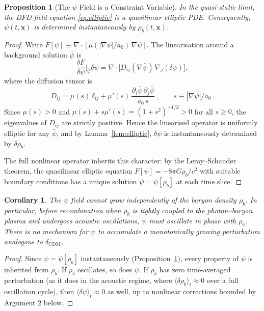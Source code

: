\documentclass[12pt,a4paper]{article}
\newtheorem{proposition}[theorem]{Proposition}
\newtheorem{corollary}[theorem]{Corollary}
\begin{document}
\begin{proposition}[The $\psi$ Field is a Constraint Variable]
\label{prop:psi-constraint}
In the quasi-static limit, the DFD field equation \eqref{eq:elliptic}
is a quasilinear elliptic PDE. Consequently, $\psi(t,\mathbf{x})$
is determined instantaneously by $\rho_b(t,\mathbf{x})$.
\end{proposition}

\begin{proof}
Write $F[\psi] \equiv \nabla \cdot [\mu(|\nabla\psi|/a_0)\,\nabla\psi]$.
The linearisation around a background solution $\bar{\psi}$ is
\begin{equation}
\frac{\delta F}{\delta \psi}\bigg|_{\bar{\psi}} \delta\psi
= \nabla \cdot \bigl[D_{ij}(\nabla\bar{\psi})\,\nabla_j(\delta\psi)\bigr],
\end{equation}
where the diffusion tensor is
\begin{equation}
\label{eq:diffusion-tensor}
D_{ij} = \mu(s)\,\delta_{ij} + \mu'(s)\,\frac{\partial_i\bar{\psi}\,
\partial_j\bar{\psi}}{a_0\,s}\,,
\qquad s \equiv |\nabla\bar{\psi}|/a_0\,.
\end{equation}
Since $\mu(s) > 0$ and $\mu(s) + s\mu'(s) = (1+s^2)^{-1/2} > 0$
for all $s \geq 0$, the eigenvalues of $D_{ij}$ are strictly positive.
Hence the linearised operator is uniformly elliptic for any $\bar{\psi}$,
and by Lemma~\ref{lem:elliptic}, $\delta\psi$ is instantaneously
determined by $\delta\rho_b$.

The full nonlinear operator inherits this character: by the
Leray--Schauder theorem, the quasilinear elliptic equation
$F[\psi] = -8\pi G\rho_b/c^2$ with suitable boundary conditions has a
unique solution $\psi = \psi[\rho_b]$ at each time slice.
\end{proof}

\begin{corollary}
\label{cor:no-independent-growth}
The $\psi$ field cannot grow independently of the baryon density
$\rho_b$. In particular, before recombination when $\rho_b$ is
tightly coupled to the photon--baryon plasma and undergoes acoustic
oscillations, $\psi$ must oscillate in phase with $\rho_b$. There is
no mechanism for $\psi$ to accumulate a monotonically growing
perturbation analogous to $\delta_{\mathrm{CDM}}$.
\end{corollary}

\begin{proof}
Since $\psi = \psi[\rho_b]$ instantaneously (Proposition~\ref{prop:psi-constraint}),
every property of $\psi$ is inherited from $\rho_b$. If $\rho_b$
oscillates, so does $\psi$. If $\rho_b$ has zero time-averaged
perturbation (as it does in the acoustic regime, where
$\langle\delta\rho_b\rangle_t \approx 0$ over a full oscillation cycle),
then $\langle\delta\psi\rangle_t \approx 0$ as well, up to nonlinear
corrections bounded by Argument 2 below.
\end{proof}
\end{document}
